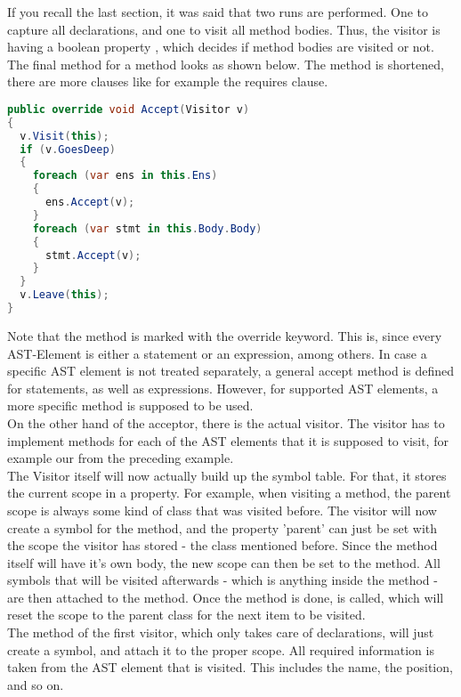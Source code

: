 If you recall the last section, it was said that two runs are performed.
One to capture all declarations, and one to visit all method bodies.
Thus, the visitor is having a boolean property , which decides if method bodies are visited or not.
The final  method for a method looks as shown below.
The method is shortened, there are more clauses like for example the requires clause.


\begin{lstlisting}[language=csharp, caption={Accepting a Visitor}, captionpos=b, label={lst:visitoraccept}]
public override void Accept(Visitor v)
{
  v.Visit(this);
  if (v.GoesDeep)
  {
    foreach (var ens in this.Ens)
    {
      ens.Accept(v);
    }
    foreach (var stmt in this.Body.Body)
    {
      stmt.Accept(v);
    }
  }
  v.Leave(this);
}
\end{lstlisting}

Note that the method is marked with the override keyword.
This is, since every AST-Element is either a statement or an expression, among others.
In case a specific AST element is not treated separately, a general accept method is defined for statements, as well as expressions.
However, for supported AST elements, a more specific method is supposed to be used.\\

On the other hand of the acceptor, there is the actual visitor.
The visitor has to implement  methods for each of the AST elements that it is supposed to visit, for example our  from the preceding example.\\

The Visitor itself will now actually build up the symbol table.
For that, it stores the current scope in a property.
For example, when visiting a method, the parent scope is always some kind of class that was visited before.
The visitor will now create a symbol for the method, and the property 'parent' can just be set with the scope the visitor has stored - the class mentioned before.
Since the method itself will have it's own body, the new scope can then be set to the method.
All symbols that will be visited afterwards - which is anything inside the method - are then attached to the method.
Once the method is done,  is called, which will reset the scope to the parent class for the next item to be visited.\\

The  method of the first visitor, which only takes care of declarations, will just create a symbol, and attach it to the proper scope.
All required information is taken from the AST element that is visited.
This includes the name, the position, and so on.\\


